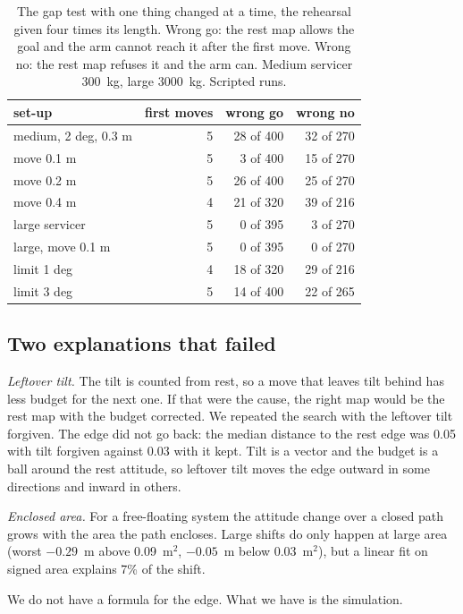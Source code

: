 \documentclass[pdflatex,sn-mathphys-num]{sn-jnl}
\begin{document}
\begin{table}[t]\centering
\caption{The gap test with one thing changed at a time, the rehearsal given four times its length. Wrong go: the
rest map allows the goal and the arm cannot reach it after the first move. Wrong no: the rest map refuses it and the
arm can. Medium servicer 300~kg, large 3000~kg. Scripted runs.}\label{tab:setups}
\begin{tabular}{lrrr}
\toprule
set-up & first moves & wrong go & wrong no \\
\midrule
medium, 2 deg, 0.3 m & 5 & 28 of 400 & 32 of 270 \\
move 0.1 m & 5 & 3 of 400 & 15 of 270 \\
move 0.2 m & 5 & 26 of 400 & 25 of 270 \\
move 0.4 m & 4 & 21 of 320 & 39 of 216 \\
large servicer & 5 & 0 of 395 & 3 of 270 \\
large, move 0.1 m & 5 & 0 of 395 & 0 of 270 \\
limit 1 deg & 4 & 18 of 320 & 29 of 216 \\
limit 3 deg & 5 & 14 of 400 & 22 of 265 \\
\bottomrule
\end{tabular}
\end{table}

\subsection{Two explanations that failed}
\emph{Leftover tilt.} The tilt is counted from rest, so a move that leaves tilt behind has less budget for the
next one. If that were the cause, the right map would be the rest map with the budget corrected. We repeated the
search with the leftover tilt forgiven. The edge did not go back: the median distance to the rest edge was 0.05
with tilt forgiven against 0.03 with it kept. Tilt is a vector and the budget is a ball around the rest
attitude, so leftover tilt moves the edge outward in some directions and inward in others. %

\emph{Enclosed area.} For a free-floating system the attitude change over a closed path grows with the area the
path encloses. Large shifts do only happen at large area (worst $-0.29$~m above 0.09~m$^2$, $-0.05$~m below
0.03~m$^2$), but a linear fit on signed area explains 7\% of the shift. %

We do not have a formula for the edge. What we have is the simulation.
\end{document}
